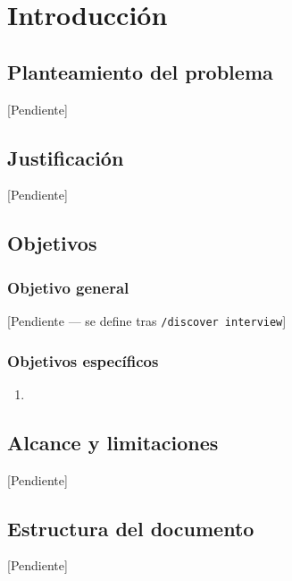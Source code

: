 \chapter{Introducción}
\label{cap:introduccion}

\section{Planteamiento del problema}
[Pendiente]

\section{Justificación}
[Pendiente]

\section{Objetivos}

\subsection{Objetivo general}
[Pendiente — se define tras \texttt{/discover interview}]

\subsection{Objetivos específicos}
\begin{enumerate}
    \item [Pendiente]
\end{enumerate}

\section{Alcance y limitaciones}
[Pendiente]

\section{Estructura del documento}
[Pendiente]
